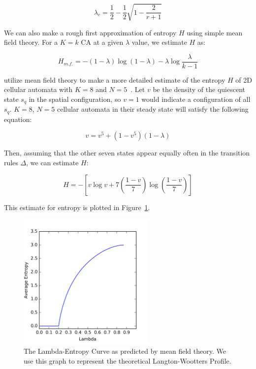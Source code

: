 \documentclass[a4paper,11pt]{article}
\begin{document}
\begin{equation}
\lambda_c = \frac{1}{2} - \frac{1}{2}\sqrt{1 - \frac{2}{r+1}}
\end{equation}

We can also make a rough first approximation of entropy $H$ using simple mean field theory. For a $K=k$ CA at a given $\lambda$ value, we estimate $H$ as:

\begin{equation}
H_{m.f.} = - (1- \lambda) \log (1-\lambda) - \lambda \log \frac{\lambda}{k-1}
\end{equation}

\citeauthor{wo90} utilize mean field theory to make a more detailed estimate of the entropy $H$ of 2D cellular automata with $K=8$ and $N=5$~\cite{wo90}. Let $v$ be the density of the quiescent state $s_q$ in the spatial configuration, so $v=1$ would indicate a configuration of all $s_q$. $K=8$, $N=5$ cellular automata in their steady state will satisfy the following equation:

\begin{equation}
v = v^5 + (1 - v^5)(1- \lambda)
\end{equation}

\noindent Then, assuming that the other seven states appear equally often in the transition rules $\Delta$, we can estimate $H$:

\begin{equation}
H = -\left[ v \log v + 7\left(\frac{1-v}{7}\right)\log\left(\frac{1-v}{7}\right)\right]
\end{equation}

\noindent This estimate for entropy is plotted in Figure~\ref{fig:mft_lambda}.

\begin{figure}[htp]
\centering
\includegraphics[width=0.6\textwidth]{app_figs/mft_lambda}
\caption[Mean Field Theory Lambda-Entropy Curve]{
	The Lambda-Entropy Curve as predicted by mean field theory. We use this graph to represent the theoretical Langton-Wootters Profile.
}
\label{fig:mft_lambda}
\end{figure}

\processdelayedfloats

\clearpage



\end{document}
